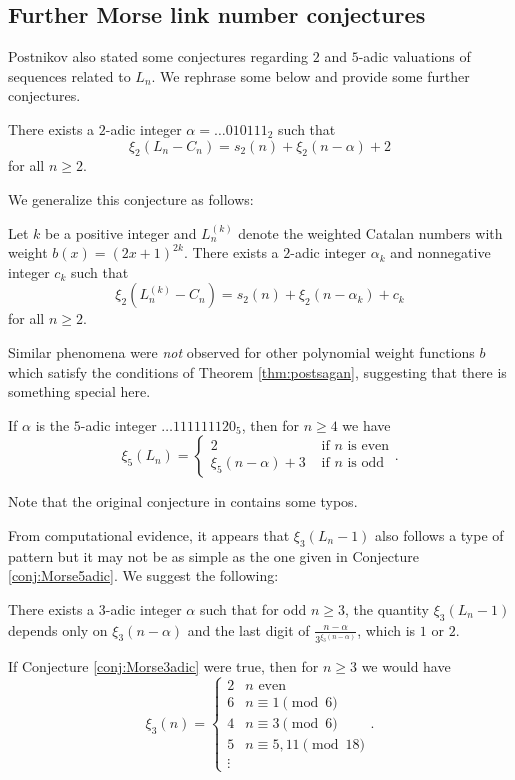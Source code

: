 \subsection{Further Morse link number conjectures}\label{subsec:valuationconjectures}

Postnikov also stated some conjectures regarding $2$ and $5$-adic valuations of sequences related to $L_n$. We rephrase some below and provide some further conjectures.

\begin{conjecture}
    There exists a $2$-adic integer $\alpha=\dotsc 010111_2$ such that
    \[\xi_2(L_n-C_n)=s_2(n)+\xi_2(n-\alpha)+2\]
    for all $n\geq 2$.
\end{conjecture}

We generalize this conjecture as follows:

\begin{conjecture}
    Let $k$ be a positive integer and $L^{(k)}_n$ denote the weighted Catalan numbers with weight $b(x)=(2x+1)^{2k}$. There exists a $2$-adic integer $\alpha_k$ and nonnegative integer $c_k$ such that
    \[\xi_2(L_n^{(k)}-C_n)=s_2(n)+\xi_2(n-\alpha_k)+c_k\]
    for all $n\geq 2$.
\end{conjecture}

Similar phenomena were \emph{not} observed for other polynomial weight functions $b$ which satisfy the conditions of Theorem \ref{thm:postsagan}, suggesting that there is something special here.

\begin{conjecture}
\label{conj:Morse5adic}
    If $\alpha$ is the $5$-adic integer $\dotsc 111111120_5$, then for $n\geq 4$ we have
    \[\xi_5(L_n)=\begin{cases}
    2 &\text{ if $n$ is even} \\
    \xi_5(n-\alpha)+3 &\text{ if $n$ is odd}
    \end{cases}.\]
\end{conjecture}
Note that the original conjecture in \cite{postnikov2000morse} contains some typos.

From computational evidence, it appears that $\xi_3(L_n-1)$ also follows a type of pattern but it may not be as simple as the one given in Conjecture \ref{conj:Morse5adic}. We suggest the following:

\begin{conjecture}
\label{conj:Morse3adic}
    There exists a $3$-adic integer $\alpha$ such that for odd $n\geq 3$, the quantity $\xi_3(L_n-1)$ depends only on $\xi_3(n-\alpha)$ and the last digit of $\frac{n-\alpha}{3^{\xi_3(n-\alpha)}}$, which is $1$ or $2$.
\end{conjecture}
If Conjecture \ref{conj:Morse3adic} were true, then for $n\geq 3$ we would have
\[\xi_3(n) =\begin{cases}
2 & n\text{ even} \\
6 & n\equiv 1\pmod{6} \\
4 & n\equiv 3\pmod{6} \\
5 & n\equiv 5, 11 \pmod{18} \\
\vdots
\end{cases}.\]